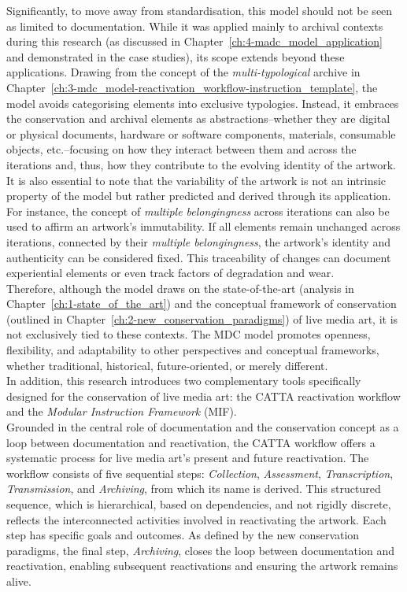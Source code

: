 Significantly, to move away from standardisation, this model should not be seen as limited to documentation. While it was applied mainly to archival contexts during this research (as discussed in Chapter~\ref{ch:4-madc_model_application} and demonstrated in the case studies), its scope extends beyond these applications. Drawing from the concept of the \textit{multi-typological} archive in Chapter~\ref{ch:3-mdc_model-reactivation_workflow-instruction_template}, the model avoids categorising elements into exclusive typologies. Instead, it embraces the conservation and archival elements as abstractions–whether they are digital or physical documents, hardware or software components, materials, consumable objects, etc.–focusing on how they interact between them and across the iterations and, thus, how they contribute to the evolving identity of the artwork.\\
It is also essential to note that the variability of the artwork is not an intrinsic property of the model but rather predicted and derived through its application. For instance, the concept of \textit{multiple belongingness} across iterations can also be used to affirm an artwork's immutability. If all elements remain unchanged across iterations, connected by their \textit{multiple belongingness}, the artwork's identity and authenticity can be considered fixed. This traceability of changes can document experiential elements or even track factors of degradation and wear.\\
Therefore, although the model draws on the state-of-the-art (analysis in Chapter~\ref{ch:1-state_of_the_art}) and the conceptual framework of conservation (outlined in Chapter~\ref{ch:2-new_conservation_paradigms}) of live media art, it is not exclusively tied to these contexts. The MDC model promotes openness, flexibility, and adaptability to other perspectives and conceptual frameworks, whether traditional, historical, future-oriented, or merely different.\\
In addition, this research introduces two complementary tools specifically designed for the conservation of live media art: the CATTA reactivation workflow and the \textit{Modular Instruction Framework} (MIF).\\
Grounded in the central role of documentation and the conservation concept as a loop between documentation and reactivation, the CATTA workflow offers a systematic process for live media art's present and future reactivation. The workflow consists of five sequential steps: \textit{Collection}, \textit{Assessment}, \textit{Transcription}, \textit{Transmission}, and \textit{Archiving}, from which its name is derived. This structured sequence, which is hierarchical, based on dependencies, and not rigidly discrete, reflects the interconnected activities involved in reactivating the artwork. Each step has specific goals and outcomes. As defined by the new conservation paradigms, the final step, \textit{Archiving}, closes the loop between documentation and reactivation, enabling subsequent reactivations and ensuring the artwork remains alive.\\
